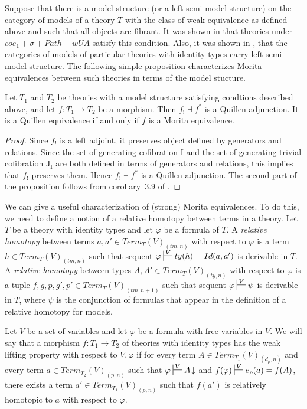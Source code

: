 \documentclass[reqno]{amsart}
\theoremstyle{definition}
\theoremstyle{remark}
\newcommand{\I}{\mathrm{I}}
\newcommand{\J}{\mathrm{J}}
\numberwithin{figure}{section}
\begin{document}
Suppose that there is a model structure (or a left semi-model structure) on the category of models of a theory $T$
with the class of weak equivalence as defined above and such that all objects are fibrant.
It was shown in \cite{alg-models} that theories under $coe_1 + \sigma + Path + wUA$ satisfy this condition.
Also, it was shown in \cite{kap-lum-model}, that the categories of models of particular theories with identity types carry left semi-model structure.
The following simple proposition characterizes Morita equivalences between such theories in terms of the model stucture.

\begin{prop}
Let $T_1$ and $T_2$ be theories with a model structure satisfying condtions described above, and let $f : T_1 \to T_2$ be a morphism.
Then $f_! \dashv f^*$ is a Quillen adjunction.
It is a Quillen equivalence if and only if $f$ is a Morita equivalence.
\end{prop}
\begin{proof}
Since $f_!$ is a left adjoint, it preserves object defined by generators and relations.
Since the set of generating cofibration $\I$ and the set of generating trivial cofibration $\J_\I$
are both defined in terms of generators and relations, this implies that $f_!$ preserves them.
Hence $f_! \dashv f^*$ is a Quillen adjunction.
The second part of the proposition follows from corollary~3.9 of \cite{f-model-structures}.
\end{proof}

We can give a useful characterization of (strong) Morita equivalences.
To do this, we need to define a notion of a relative homotopy between terms in a theory.
Let $T$ be a theory with identity types and let $\varphi$ be a formula of $T$.
A \emph{relative homotopy} between terms $a,a' \in Term_T(V)_{(tm,n)}$ with respect to $\varphi$ is a term $h \in Term_T(V)_{(tm,n)}$
such that sequent $\varphi \sststile{}{V} ty(h) = Id(a,a')$ is derivable in $T$.
A \emph{relative homotopy} between types $A,A' \in Term_T(V)_{(ty,n)}$ with respect to $\varphi$ is a tuple $f,g,p,g',p' \in Term_T(V)_{(tm,n+1)}$
such that sequent $\varphi \sststile{}{V} \psi$ is derivable in $T$, where $\psi$ is the conjunction of formulas that appear in the definition of a relative homotopy for models.

Let $V$ be a set of variables and let $\varphi$ be a formula with free variables in $V$.
We will say that a morphism $f : T_1 \to T_2$ of theories with identity types has the weak lifting property with respect to $V,\varphi$ if
for every term $A \in Term_{T_1}(V)_{(d_p,n)}$ and every term $a \in Term_{T_2}(V)_{(p,n)}$ such that $\varphi \sststile{}{V} A\!\downarrow$ and $f(\varphi) \sststile{}{V} e_p(a) = f(A)$,
there exists a term $a' \in Term_{T_1}(V)_{(p,n)}$ such that $f(a')$ is relatively homotopic to $a$ with respect to $\varphi$.
\end{document}
